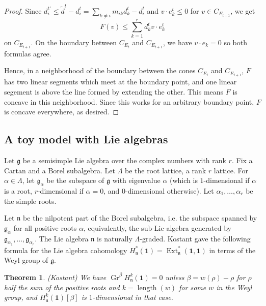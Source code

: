 \documentclass[11pt,letterpaper]{article}
\newtheorem{theorem}{Theorem}[section]
\theoremstyle{definition}
\theoremstyle{remark}
\numberwithin{equation}{section}
\theoremstyle{dotless}
\newcommand{\Gr}{\operatorname{Gr}}
\renewcommand{\tilde}{\widetilde}
\newcommand{\LieH}{H}
\newcommand{\Ext}{\operatorname{Ext}}
\begin{document}
\begin{proof}
Since $d_i^{t'} \leq \tilde{d}^t - d_i^t = \sum_{k\neq i} m_{ik } d_k^t  - d_i^t$ and $ v \cdot e_k^t \leq 0$ for $v \in C_{E_{t+1}}$,  we get $$F(v) \leq \sum_{k=1}^r d_{k}^t v\cdot e_k^t$$ on $C_{E_{t+1}}$. On the boundary between $C_{E_t}$ and $C_{E_{t+1}}$, we have $v \cdot e_k=0$ so both formulas agree.

Hence, in a neighborhood of the boundary between the cones $C_{E_t}$ and $C_{E_{t+1}}$, $F$ has two linear segments which meet at the boundary point, and one linear segement is above the line formed by extending the other. This means $F$ is concave in this neighborhood. Since this works for an arbitrary boundary point, $F$ is concave everywhere, as desired.\end{proof}

\subsection{A toy model with Lie algebras}\label{ss:Kostant}

Let $\mathfrak g$ be a semisimple Lie algebra over the complex numbers with rank $r$. Fix a Cartan and a Borel subalgebra. Let $\Lambda$ be the root lattice, a rank $r$ lattice. For $\alpha \in \Lambda$, let $\mathfrak g_\alpha$ be the subspace of $\mathfrak g$ with eigenvalue $\alpha$ (which is $1$-dimensional if $\alpha$ is a root, $r$-dimensional if $\alpha=0$, and $0$-dimensional otherwise). Let $\alpha_1,\dots, \alpha_r$ be the simple roots.

 Let $\mathfrak n$ be the nilpotent part of the Borel subalgebra, i.e. the subspace spanned by $\mathfrak g_\alpha$ for all positive roots $\alpha$, equivalently, the sub-Lie-algebra generated by $\mathfrak g_{\alpha_1},\dots, \mathfrak g_{\alpha_r}$. The Lie algebra $\mathfrak n$ is naturally $\Lambda$-graded. Kostant gave the following formula for the Lie algebra cohomology $\LieH^*_{\mathfrak n} ( \mathbf 1) = \Ext^*_{\mathfrak n } (\mathbf 1, \mathbf 1)$ in terms of the Weyl group of $\mathfrak g$.
 
 
 \begin{theorem}\label{kostant}(Kostant) We have $ \Gr^\beta \LieH^{k}_{\mathfrak n} ( \mathbf 1) =0 $ unless $\beta = w(\rho)-\rho$ for $\rho$ half the sum of the positive roots and $k= \operatorname{length}(w)$ for some $w$ in the Weyl group, and $\LieH^{k}_{\mathfrak n} ( \mathbf 1) [\beta]$ is $1$-dimensional in that case. \end{theorem}

 
 
\end{document}
